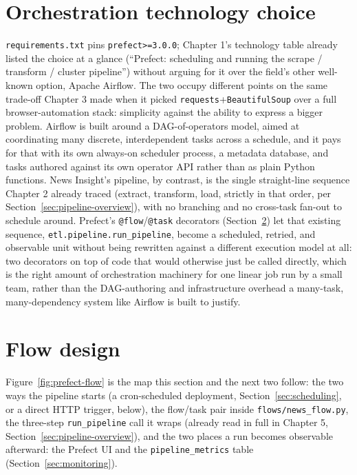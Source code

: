 \section{Orchestration technology choice}
\label{sec:orch-choice}
\begin{sloppypar}
\texttt{requirements.txt} pins \texttt{prefect>=3.0.0}; Chapter 1's technology table already listed the choice at a glance (``Prefect: scheduling and running the scrape / transform / cluster pipeline'') without arguing for it over the field's other well-known option, Apache Airflow. The two occupy different points on the same trade-off Chapter 3 made when it picked \texttt{requests}+\texttt{BeautifulSoup} over a full browser-automation stack: simplicity against the ability to express a bigger problem. Airflow is built around a DAG-of-operators model, aimed at coordinating many discrete, interdependent tasks across a schedule, and it pays for that with its own always-on scheduler process, a metadata database, and tasks authored against its own operator API rather than as plain Python functions. News Insight's pipeline, by contrast, is the single straight-line sequence Chapter 2 already traced (extract, transform, load, strictly in that order, per Section~\ref{sec:pipeline-overview}), with no branching and no cross-task fan-out to schedule around. Prefect's \texttt{@flow}/\texttt{@task} decorators (Section~\ref{sec:flow-design}) let that existing sequence, \texttt{etl.pipeline.run\_pipeline}, become a scheduled, retried, and observable unit without being rewritten against a different execution model at all: two decorators on top of code that would otherwise just be called directly, which is the right amount of orchestration machinery for one linear job run by a small team, rather than the DAG-authoring and infrastructure overhead a many-task, many-dependency system like Airflow is built to justify.
\end{sloppypar}

\section{Flow design}
\label{sec:flow-design}
\begin{sloppypar}
Figure~\ref{fig:prefect-flow} is the map this section and the next two follow: the two ways the pipeline starts (a cron-scheduled deployment, Section~\ref{sec:scheduling}, or a direct HTTP trigger, below), the flow/task pair inside \texttt{flows/\allowbreak news\_flow.py}, the three-step \texttt{run\_pipeline} call it wraps (already read in full in Chapter 5, Section~\ref{sec:pipeline-overview}), and the two places a run becomes observable afterward: the Prefect UI and the \texttt{pipeline\_metrics} table (Section~\ref{sec:monitoring}).
\end{sloppypar}

